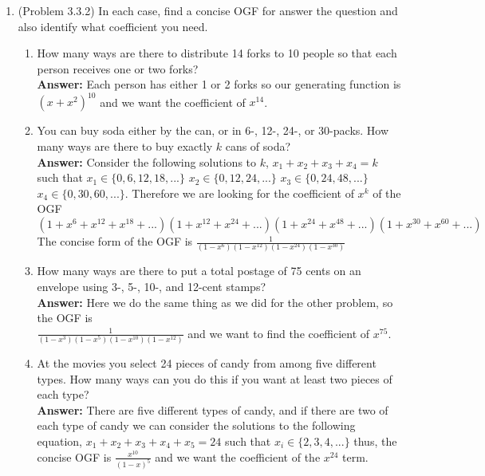 \documentclass{amsart}
\begin{document}
\begin{enumerate}
	
	
	

\item (Problem 3.3.2) In each case, find a concise OGF for answer the question and also identify what coefficient you need.\\
	\begin{enumerate}
	\item How many ways are there to distribute 14 forks to 10 people so that each person receives one or two forks?\\
\textbf{Answer:} Each person has either 1 or 2 forks so our generating function is $(x+x^2)^{10}$ and we want the coefficient of $x^{14}$. \\

	\item You can buy soda either by the can, or in 6-, 12-, 24-, or 30-packs. How many ways are there to buy exactly $k$ cans of soda?\\
\textbf{Answer:} Consider the following solutions to $k$, $x_1+x_2+x_3+x_4=k$ such that $x_1\in\{0,6,12,18,...\}$ $x_2\in\{0,12,24,...\}$ $x_3\in\{0,24,48,...\}$ $x_4\in\{0,30,60,...\}$. Therefore we are looking for the coefficient of $x^k$ of the OGF $(1+x^6+x^{12}+x^{18}+...)(1+x^{12}+x^{24}+...)(1+x^{24}+x^{48}+...)(1+x^{30}+x^{60}+...)$ The concise form of the OGF is $\frac{1}{(1-x^6)(1-x^{12})(1-x^{24})(1-x^{30})}$\\


	\item  How many ways are there to put a total postage of 75 cents on an envelope using 3-, 5-, 10-, and 12-cent stamps?\\
	\textbf{Answer:}	 Here we do the same thing as we did for the other problem, so the OGF is\\
	 $\frac{1}{(1-x^3)(1-x^{5})(1-x^{10})(1-x^{12})}$ and we want to find the coefficient of $x^{75}$.\\
	
	
	
	
	\item  At the movies you select 24 pieces of candy from among five different types. How many ways can you do this if you want at least two pieces of each type?\\
	\textbf{Answer:}	  There are five different types of candy, and if there are two of each type of candy we can consider the solutions to the following equation, $x_1+x_2+x_3+x_4+x_5=24$ such that $x_i \in \{2,3,4,...\}$ thus, the concise OGF is $\frac{x^10}{(1-x)^5}$ and we want the coefficient of the $x^24$ term. \\
	

\end{enumerate}
\end{enumerate}
\end{document}
